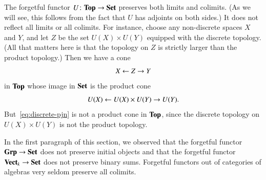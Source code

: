 \begin{example}
The forgetful functor $U\from \Tp \to \Set$%
%
%
%
preserves both limits and colimits.  (As we will see, this follows from the
fact that $U$ has adjoints on both sides.)  It does not reflect all limits
or all colimits.  For instance, choose any non-discrete spaces $X$ and $Y$,
and let $Z$ be the set $U(X) \times U(Y)$ equipped with the discrete
topology.  (All that matters here is that the topology on $Z$ is strictly
larger than the product topology.)  Then we have a cone
% 
\begin{equation}        
\label{eq:discrete-pjn}
X \leftarrow Z \to Y
\end{equation}
% 
in $\mathbf{Top}$ whose image in $\mathbf{Set}$ is the product cone
\[
U(X) \leftarrow U(X) \times U(Y) \to U(Y).
\]
But~\eqref{eq:discrete-pjn} is not a product cone in $\mathbf{Top}$, since the
discrete topology on $U(X) \times U(Y)$ is not the product topology.
\end{example}

\begin{example}
In the first paragraph of this section, we observed that the forgetful
functor $\mathbf{Grp} \to \mathbf{Set}$%
%
%
does not preserve initial objects and that the forgetful functor $\mathbf{Vect}_k
\to \mathbf{Set}$%
%
%
does not preserve binary sums.  Forgetful functors out of categories of
algebras very seldom preserve all colimits.
\end{example}

